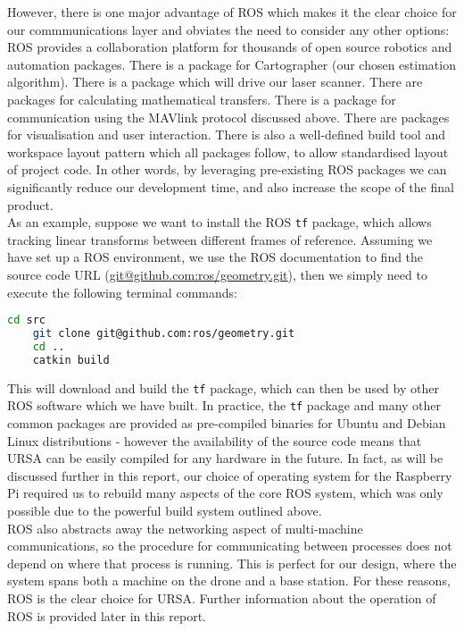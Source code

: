 \documentclass[capstone_report.tex]{subfiles}
\begin{document}
However, there is one major advantage of ROS which makes it the clear choice for our commmunications layer and obviates the need to consider any other options: ROS provides a collaboration platform for thousands of open source robotics and automation packages. There is a package for Cartographer (our chosen estimation algorithm). There is a package which will drive our laser scanner. There are packages for calculating mathematical transfers. There is a package for communication using the MAVlink protocol discussed above. There are packages for visualisation and user interaction. There is also a well-defined build tool and workspace layout pattern which all packages follow, to allow standardised layout of project code. In other words, by leveraging pre-existing ROS packages we can significantly reduce our development time, and also increase the scope of the final product. \\

As an example, suppose we want to install the ROS \texttt{tf} package, which allows tracking linear transforms between different frames of reference. Assuming we have set up a ROS environment, we use the ROS documentation to find the source code URL (\url{git@github.com:ros/geometry.git}), then we simply need to execute the following terminal commands:

\begin{lstlisting}[language=bash]
	cd src
	git clone git@github.com:ros/geometry.git
	cd ..
	catkin build
\end{lstlisting}

This will download and build the \texttt{tf} package, which can then be used by other ROS software which we have built. In practice, the \texttt{tf} package and many other common packages are provided as pre-compiled binaries for Ubuntu and Debian Linux distributions - however the availability of the source code means that URSA can be easily compiled for any hardware in the future. In fact, as will be discussed further in this report, our choice of operating system for the Raspberry Pi required us to rebuild many aspects of the core ROS system, which was only possible due to the powerful build system outlined above.\\

ROS also abstracts away the networking aspect of multi-machine communications, so the procedure for communicating between processes does not depend on where that process is running. This is perfect for our design, where the system spans both a machine on the drone and a base station. For these reasons, ROS is the clear choice for URSA. Further information about the operation of ROS is provided later in this report.
\end{document}
